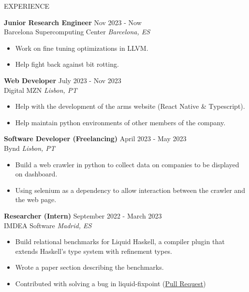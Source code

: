 \documentclass{resume} %
\begin{document}

\begin{rSection}{EXPERIENCE}

  \textbf{Junior Research Engineer} \hfill Nov 2023 - Now\\
  Barcelona Supercomputing Center \hfill \textit{Barcelona, ES}
  \begin{itemize}
    \itemsep -3pt {}
  \item Work on fine tuning optimizations in LLVM.
  \item Help fight back against bit rotting.
  \end{itemize}
  
  \textbf{Web Developer} \hfill July 2023 - Nov 2023\\
  Digital MZN \hfill \textit{Lisbon, PT}
  \begin{itemize}
    \itemsep -3pt {}
  \item Help with the development of the arms website (React Native \& Typescript).
  \item Help maintain python environments of other members of the company.
  \end{itemize}
  
  \textbf{Software Developer (Freelancing)} \hfill April 2023 - May 2023\\
  Bynd \hfill \textit{Lisbon, PT}
  \begin{itemize}
    \itemsep -3pt {}    
  \item Build a web crawler in python to collect data on companies to
    be displayed on dashboard.
  \item Using selenium as a dependency to allow interaction between the
    crawler and the web page.
  \end{itemize}

  \textbf{Researcher (Intern)} \hfill September 2022 - March 2023\\
  IMDEA Software \hfill \textit{Madrid, ES}
  \begin{itemize}
    \itemsep -3pt {}
  \item Build relational benchmarks for Liquid Haskell, a compiler plugin that extends Haskell’s type system with refinement types.
  \item Wrote a paper section describing the benchmarks.
  \item Contributed with solving a bug in liquid-fixpoint    (\href{https://github.com/ucsd-progsys/liquid-fixpoint/pull/626}{Pull Request})
  \end{itemize}
  

\end{rSection}
\end{document}
